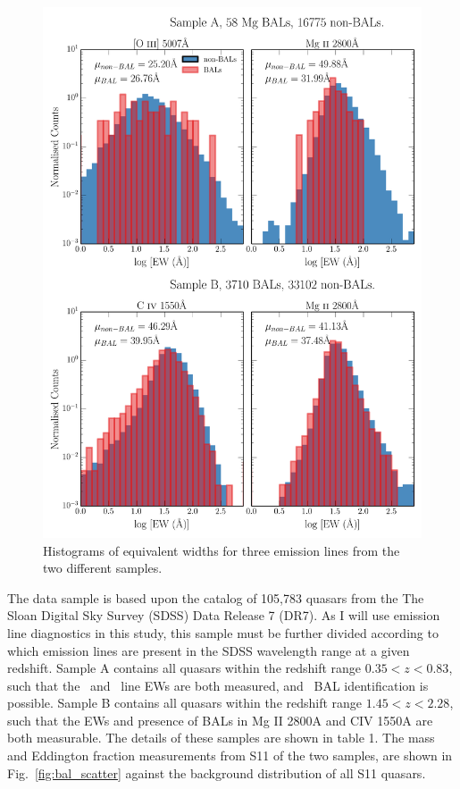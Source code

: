 \begin{figure} %
\centering
\includegraphics[width=1.0\textwidth]{figures/ewpaper/ew_hist_qsos.png}
\caption
{
Histograms of equivalent widths for three emission lines from the two different samples.
}
\label{fig:ew_hists}
\end{figure} %

The data sample is based upon the
\citet[][hereafter S11]{shen2011} catalog of
105,783 quasars from the The Sloan Digital Sky Survey (SDSS) 
Data Release 7 (DR7). 
As I will use emission line diagnostics in this study,
this sample must be further divided according to which 
emission lines are present in 
the SDSS wavelength range at a given redshift. 
Sample A contains all quasars within the redshift range $0.35<z<0.83$, 
such that the \mgline\ and \oiiifull\ line EWs are both measured, 
and \mg\ BAL identification
is possible.  Sample B contains all quasars within the redshift 
range $1.45<z<2.28$, such that 
the EWs and presence of BALs in Mg II 2800A and CIV 1550A are both measurable.
The details of these samples are shown in table 1.
The mass and Eddington fraction measurements from S11 of the two samples,
are shown in Fig.~\ref{fig:bal_scatter}
against the background distribution of all S11 quasars.


